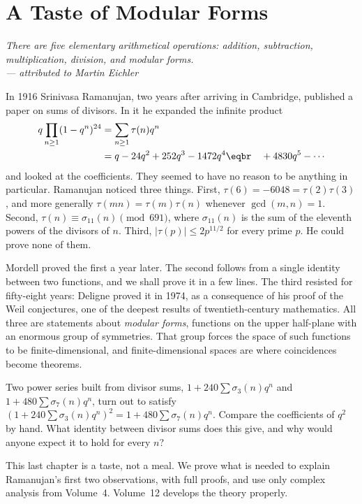 \chapter{A Taste of Modular Forms}

\begin{center}\itshape
There are five elementary arithmetical operations: addition, subtraction, multiplication, division, and modular forms.\\
\upshape --- attributed to Martin Eichler
\end{center}

In 1916 Srinivasa Ramanujan, two years after arriving in Cambridge, published a paper on sums of divisors. In it he expanded the infinite product
\[
\begin{aligned}q\prod_{n\ge1}(1-q^n)^{24}&=\sum_{n\ge1}\tau(n)q^n\\&=q-24q^2+252q^3-1472q^4\eqbr\quad+4830q^5-\cdots\end{aligned}
\]
and looked at the coefficients. They seemed to have no reason to be anything in particular. Ramanujan noticed three things. First, $\tau(6)=-6048=\tau(2)\tau(3)$, and more generally $\tau(mn)=\tau(m)\tau(n)$ whenever
$\gcd(m,n)=1$. Second, $\tau(n)\equiv\sigma_{11}(n)\pmod{691}$, where $\sigma_{11}(n)$ is the sum of the eleventh powers of the divisors of $n$. Third, $|\tau(p)|\le2p^{11/2}$ for every prime $p$. He could prove none of them.

Mordell proved the first a year later. The second follows from a single identity between two functions, and we shall prove it in a few lines. The third resisted for fifty-eight years: Deligne proved it in 1974,
as a consequence of his proof of the Weil conjectures, one of the deepest results of twentieth-century mathematics. All three are statements about \emph{modular forms}, functions on the upper half-plane with an
enormous group of symmetries. That group forces the space of such functions to be finite-dimensional, and finite-dimensional spaces are where coincidences become theorems.

\begin{think}
Two power series built from divisor sums, $1+240\sum\sigma_3(n)q^n$ and $1+480\sum\sigma_7(n)q^n$, turn out to satisfy $(1+240\sum\sigma_3(n)q^n)^2=1+480\sum\sigma_7(n)q^n$. Compare the coefficients of $q^2$ by hand.
What identity between divisor sums does this give, and why would anyone expect it to hold for every $n$?
\end{think}

This last chapter is a taste, not a meal. We prove what is needed to explain Ramanujan's first two observations, with full proofs, and use only complex analysis from Volume~4. Volume~12 develops the theory properly.

